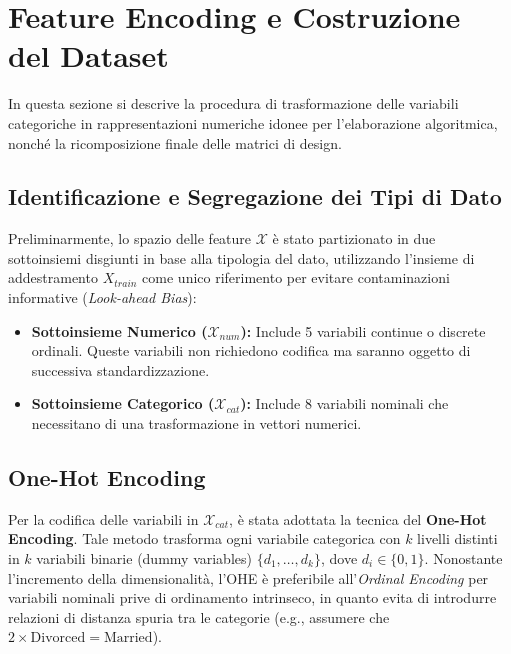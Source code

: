 \setcounter{figure}{0}
\renewcommand{\thefigure}{A.\arabic{figure}}
\setcounter{table}{0}
\renewcommand{\thetable}{A.\arabic{table}}

\section{Feature Encoding e Costruzione del Dataset}
\label{app:feature_encoding}

In questa sezione si descrive la procedura di trasformazione delle variabili categoriche in rappresentazioni numeriche idonee per l'elaborazione algoritmica, nonché la ricomposizione finale delle matrici di design.

\subsection{Identificazione e Segregazione dei Tipi di Dato}

Preliminarmente, lo spazio delle feature $\mathcal{X}$ è stato partizionato in due sottoinsiemi disgiunti in base alla tipologia del dato, utilizzando l'insieme di addestramento $X_{train}$ come unico riferimento per evitare contaminazioni informative (\textit{Look-ahead Bias}):

\begin{itemize}
    \item \textbf{Sottoinsieme Numerico ($\mathcal{X}_{num}$):} Include 5 variabili continue o discrete ordinali. Queste variabili non richiedono codifica ma saranno oggetto di successiva standardizzazione.
    \item \textbf{Sottoinsieme Categorico ($\mathcal{X}_{cat}$):} Include 8 variabili nominali che necessitano di una trasformazione in vettori numerici.
\end{itemize}

\subsection{One-Hot Encoding}

Per la codifica delle variabili in $\mathcal{X}_{cat}$, è stata adottata la tecnica del \textbf{One-Hot Encoding}. Tale metodo trasforma ogni variabile categorica con $k$ livelli distinti in $k$ variabili binarie (dummy variables) $\{d_1, \dots, d_k\}$, dove $d_i \in \{0, 1\}$.
Nonostante l'incremento della dimensionalità, l'OHE è preferibile all'\textit{Ordinal Encoding} per variabili nominali prive di ordinamento intrinseco, in quanto evita di introdurre relazioni di distanza spuria tra le categorie (e.g., assumere che $2 \times \text{Divorced} = \text{Married}$).

